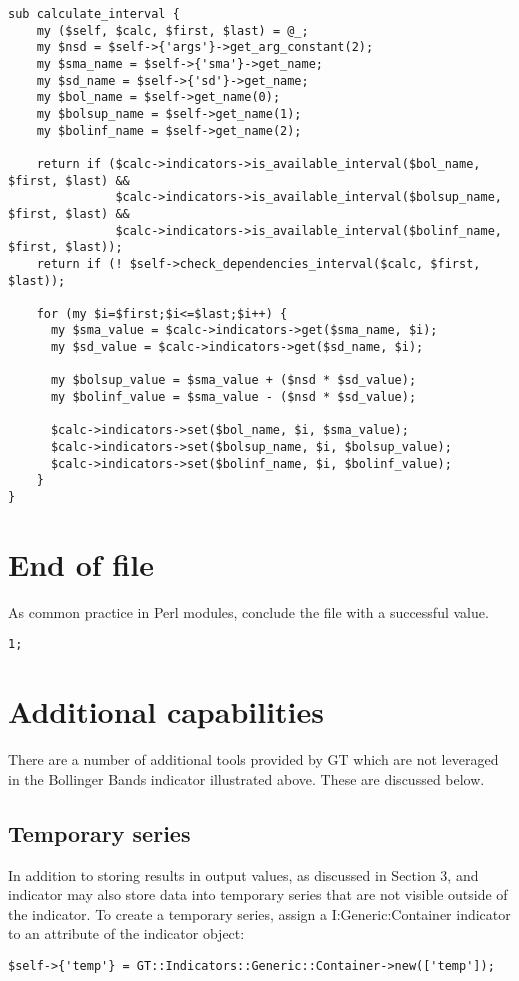\documentclass[11pt,twoside]{article}
\begin{document}
\begin{lstlisting}[name=example]
sub calculate_interval {
    my ($self, $calc, $first, $last) = @_;
    my $nsd = $self->{'args'}->get_arg_constant(2);
    my $sma_name = $self->{'sma'}->get_name;
    my $sd_name = $self->{'sd'}->get_name;
    my $bol_name = $self->get_name(0);
    my $bolsup_name = $self->get_name(1);
    my $bolinf_name = $self->get_name(2);

    return if ($calc->indicators->is_available_interval($bol_name, $first, $last) &&
               $calc->indicators->is_available_interval($bolsup_name, $first, $last) &&
               $calc->indicators->is_available_interval($bolinf_name, $first, $last));
    return if (! $self->check_dependencies_interval($calc, $first, $last));

    for (my $i=$first;$i<=$last;$i++) {
      my $sma_value = $calc->indicators->get($sma_name, $i);
      my $sd_value = $calc->indicators->get($sd_name, $i);

      my $bolsup_value = $sma_value + ($nsd * $sd_value);
      my $bolinf_value = $sma_value - ($nsd * $sd_value);

      $calc->indicators->set($bol_name, $i, $sma_value);
      $calc->indicators->set($bolsup_name, $i, $bolsup_value);
      $calc->indicators->set($bolinf_name, $i, $bolinf_value);
    }
}
\end{lstlisting}

\section{End of file}
As common practice in Perl modules, conclude the file with a successful
value.

\begin{lstlisting}[name=example]
1;
\end{lstlisting}

\section{Additional capabilities}
There are a number of additional tools provided by GT which are not
leveraged in the Bollinger Bands indicator illustrated above. These are
discussed below.

\subsection[Temporary series]{\label{bkm:Ref192502379}Temporary series}
In addition to storing results in output values, as discussed in Section
3, and indicator may also store data into temporary series that are not
visible outside of the indicator. To create a temporary series, assign
a I:Generic:Container indicator to an attribute of the indicator
object:
\begin{lstlisting}[numbers=none]
$self->{'temp'} = GT::Indicators::Generic::Container->new(['temp']);
\end{lstlisting}
\end{document}
